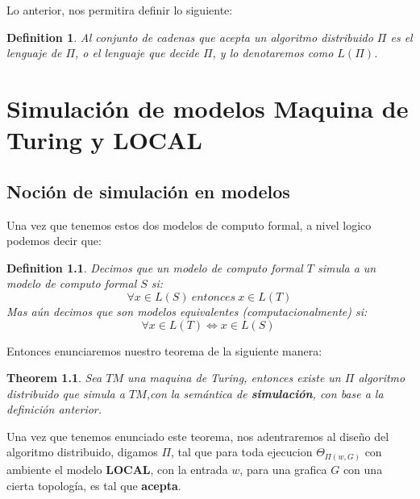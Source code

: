 \documentclass[10pt]{report}
\newtheorem{definition}{Definition}
\newtheorem{theorem}{Theorem}
\begin{document}
{    %
    Lo anterior, nos permitira definir lo siguiente:
    \begin{definition}
        Al conjunto de cadenas que acepta un algoritmo distribuido $\Pi$ es el lenguaje
        de $\Pi$, o el lenguaje que decide $\Pi$, y lo denotaremos como $L(\Pi)$.
    \end{definition}


    \chapter{Simulación de modelos Maquina de Turing y \textbf{LOCAL}}\label{ch:simulacion-de-modelostextbfytextbf}
    \section{Noción de simulación en modelos}\label{sec:nocion-de-simulación-en-modelos}
    Una vez que tenemos estos dos modelos de computo formal, a nivel logico podemos decir que:
    \theoremstyle{definition}
    \begin{definition}
        Decimos que un modelo de computo formal $T$ simula a un modelo de computo formal  $S$ si:
        \begin{equation}
        \forall x\in L(S) \ entonces \ x\in L(T)
        \end{equation}
        Mas aún decimos que son modelos equivalentes (computacionalmente) si:
        \begin{equation}
        \forall x\in L(T) \iff x\in L(S) \
        \end{equation}
    \end{definition}
    \space
    Entonces enunciaremos nuestro teorema de la siguiente manera:

    \begin{theorem}
        Sea $TM$ una maquina de Turing, entonces existe un $\Pi$ algoritmo distribuido que simula
        a $TM$,\space con la semántica de \textbf{simulación}, con base a la definición anterior.
    \end{theorem}
    Una vez que tenemos enunciado este teorema, nos adentraremos al diseño del algoritmo distribuido,
    digamos $\Pi$, tal que para toda ejecucion $\Theta_{\Pi(w,G)}$ con ambiente el modelo \textbf{LOCAL}, con la entrada $w$, para una grafica $G$ con una
    cierta topología, es tal que \textbf{acepta}.
    \newpage

}
\end{document}
